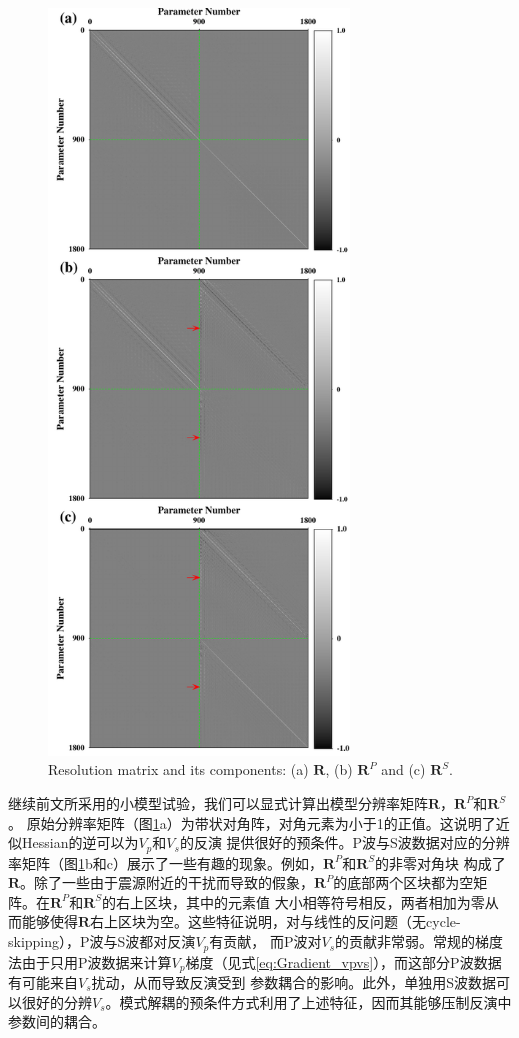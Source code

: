 \begin{figure}[!htb]
    \begin{center}
        \includegraphics[width=8cm]{Figure/chapter02/ResoOpera/Fig/resolutionoriginal.pdf}
        \caption{
Resolution matrix and its components:
(a) $\mathbf{R}$, (b) $\mathbf{R}^P$ and (c) $\mathbf{R}^S$.
    }
    \label{fig:Resolution}
    \end{center}
\end{figure}
继续前文所采用的小模型试验，我们可以显式计算出模型分辨率矩阵$\mathbf{R}$，$\mathbf{R}^P$和$\mathbf{R}^S$。
原始分辨率矩阵（图\ref{fig:Resolution}a）为带状对角阵，对角元素为小于1的正值。这说明了近似Hessian的逆可以为$V_p$和$V_s$的反演
提供很好的预条件。P波与S波数据对应的分辨率矩阵（图\ref{fig:Resolution}b和c）展示了一些有趣的现象。例如，$\mathbf{R}^P$和$\mathbf{R}^S$的非零对角块
构成了$\mathbf{R}$。除了一些由于震源附近的干扰而导致的假象，$\mathbf{R}^P$的底部两个区块都为空矩阵。在$\mathbf{R}^P$和$\mathbf{R}^S$的右上区块，其中的元素值
大小相等符号相反，两者相加为零从而能够使得$\mathbf{R}$右上区块为空。这些特征说明，对与线性的反问题（无cycle-skipping），P波与S波都对反演$V_p$有贡献，
而P波对$V_s$的贡献非常弱。常规的梯度法由于只用P波数据来计算$V_p$梯度（见式\ref{eq:Gradient_vpvs}），而这部分P波数据有可能来自$V_s$扰动，从而导致反演受到
参数耦合的影响。此外，单独用S波数据可以很好的分辨$V_s$。模式解耦的预条件方式利用了上述特征，因而其能够压制反演中参数间的耦合。

